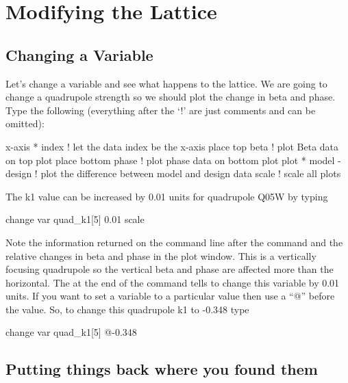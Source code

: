 \section{Modifying the Lattice}
\label{s:modify.lattice}

\subsection{Changing a Variable}
\label{ss:change.variable}

Let's change a variable and see what happens to the lattice. We are going to
change a quadrupole strength so we should plot the change in beta and phase.
Type the following (everything after the `!' are just comments and can be
omitted):
\begin{example}
  x-axis * index        ! let the data index be the x-axis
  place top beta          ! plot Beta data on top plot
  place bottom phase      ! plot phase data on bottom plot
  plot * model - design ! plot the difference between model and design data
  scale                   ! scale all plots
\end{example}

The k1 value can be increased by 0.01 units for quadrupole Q05W by typing
\begin{example}
  change var quad\_k1[5] 0.01
  scale
\end{example}
Note the information returned on the command line after the command
and the relative changes in beta and phase in the plot window. This is
a vertically focusing quadrupole so the vertical beta and phase are
affected more than the horizontal. The  at the end of the
command tells \tao to change this variable by 0.01 units. If you want
to set a variable to a particular value then use a ``@'' before the
value. So, to change this quadrupole k1 to -0.348 type
\begin{example}
  change var quad\_k1[5] @-0.348
\end{example}

\subsection{Putting things back where you found them}
\label{ss:put_it_back}

